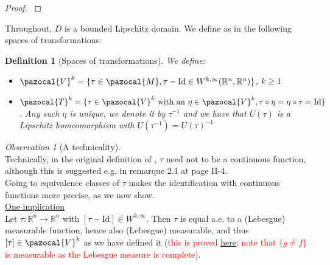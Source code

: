 \documentclass[english,a4paper,9pt,oneside]{scrbook}	%
\theoremstyle{break}
\newtheorem{defn}[equation]{Definition}
\newenvironment{mproof}[1][\proofname]{%
  \begin{proof}[#1]$ $\par\nobreak\ignorespaces
}{%
  \end{proof}
}
\renewcommand*{\proofname}{Proof}
\theoremstyle{remark}
\newtheorem{obs}[equation]{Observation}
\newcommand{\mR}{\mathbb{R}}
\newcommand{\cV}{\pazocal{V}}
\newcommand{\cT}{\pazocal{T}}
\newcommand{\id}{\text{Id}}
\begin{document}
\begin{appendices}
\begin{mproof}

\end{mproof}


Throughout, $D$ is a bounded Lipschitz domain. We define as in \cite{murat} the following spaces of transformations:

\begin{defn}[Spaces of transformations]
We define:
\begin{itemize}	
	\item $\cV^k=\{\tau \in \pazocal{M}, \tau-\id \in W^{k,\infty}(\mR^n,\mR^n)\}$, $k\geq 1$
	\item $\cT^k=\{\tau \in \cV^k \text{ with an } \eta \in \cV^k, \tau \circ \eta = \eta \circ \tau = \id\}$. Any such $\eta$ is unique, we denote it by $\tau^{-1}$ and we have that $U(\tau)$ is a Lipschitz homeomorphism with $U(\tau^{-1})=U(\tau)^{-1}$
\end{itemize} 
\end{defn}

\begin{obs}[A technicality]
 \mbox{}\\
Technically, in the original definition of \cite{murat}, $\tau$ need not to be a continuous function, although this is suggested e.g. in remarque 2.1 at page II-4.  \mbox{}\\

Going to equivalence classes of $\tau$ makes the identification with continuous functions more precise, as we now show.  \mbox{}\\

\underline{One implication} \mbox{}\\

Let $\tau: \mR^n\rightarrow\mR^n$ with $[\tau-\id] \in W^{k,\infty}$. Then $\tau$ is equal a.e. to a (Lebesgue) measurable function, hence also (Lebesgue) measurable, and thus $[\tau] \in \cV^k$ as we have defined it (\textcolor{red}{this is proved \href{https://heil.math.gatech.edu/6337/spring11/section3.4.pdf}{here}; note that $\{g\neq f\}$ is measurable as the Lebesgue measure is complete}). \mbox{}\\


\end{obs}
\end{appendices}
\end{document}
